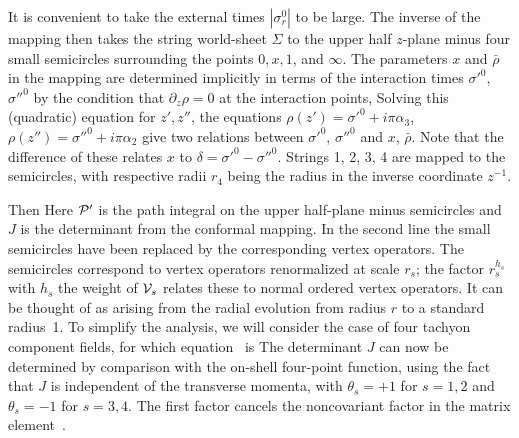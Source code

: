 It is convenient to take the external times $|\sigma^0_r|$ to be
large.  The
inverse of the mapping
\eqn{}
then takes the string world-sheet $\Sigma$ to the
upper half $z$-plane minus four small semicircles surrounding the
points $0,x,1$, and $\infty$.  The parameters $x$ and $\bar\rho$ in
the
mapping are determined implicitly in terms of the interaction times
$\sigma'^0$, $\sigma''^0$ by the condition that
$\partial_z\rho = 0$
at the interaction points,
\eqn{}
Solving this (quadratic) equation for $z', z''$, the equations
$\rho(z')
= \sigma'^0 + i \pi \alpha_3$, $\rho(z'') = \sigma''^0 + i \pi
\alpha_2$
give two relations between $\sigma'^0$, $\sigma''^0$ and $x$,
$\bar\rho$.
Note that the difference of these relates $x$ to $\delta =
\sigma'^0 - \sigma''^0$.
Strings 1, 2, 3, 4 are mapped to the
semicircles, with respective radii
\eqn{}
$r_4$ being the radius in the inverse coordinate $z^{-1}$.

Then
\eqn{}
Here ${\cal P}'$ is the path integral on the upper half-plane minus
semicircles and $J$ is the determinant from the conformal mapping.
In the second line the small semicircles have been replaced by the
corresponding vertex operators.  The semicircles correspond to vertex
operators renormalized at scale $r_s$; the factor
$r_s^{h_s}$ with $h_s$ the weight of ${\cal V}_s$ relates these to
normal ordered vertex operators.  It can be
thought of as arising from the radial evolution from radius $r$ to a
standard radius~1.
To simplify the analysis, we will consider the case of four tachyon
component fields, for which equation \conp\ is
\eqn{}
The determinant $J$ can now be determined by
comparison with the on-shell four-point function, using the fact that
$J$
is independent of the transverse momenta,
\eqn{}
with $\theta_s = +1$ for $s=1,2$ and $\theta_s = -1$ for $s= 3,4$.
The first factor cancels the noncovariant factor in the matrix
element~\calp.

